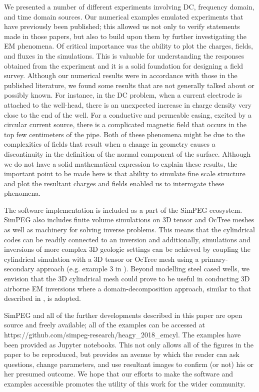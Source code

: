 We presented a number of different experiments involving DC, frequency domain, and time domain sources. Our numerical examples emulated experiments that have previously been published; this allowed us not only to verify statements made in those papers, but also to build upon them by further investigating the EM phenomena. Of critical importance was the ability to plot the charges, fields, and fluxes in the simulations. This is valuable for understanding the responses obtained from the experiment and it is a solid foundation for designing a field survey. Although our numerical results were in accordance with those in the published literature, we found some results that are not generally talked about or possibly known. For instance, in the DC problem, when a current electrode is attached to the well-head, there is an unexpected increase in charge density very close to the end of the well. For a conductive and permeable casing, excited by a circular current source, there is a complicated magnetic field that occurs in the top few centimeters of the pipe. Both of these phenomena might be due to the complexities of fields that result when a change in geometry causes a discontinuity in the definition of the normal component of the surface. Although we do not have a solid mathematical expression to explain these results, the important point to be made here is that ability to simulate fine scale structure and plot the resultant charges and fields enabled us to interrogate these phenomena.


The software implementation is included as a part of the SimPEG ecosystem. SimPEG also includes finite volume simulations on 3D tensor and OcTree meshes as well as machinery for solving inverse problems. This means that the cylindrical codes can be readily connected to an inversion and additionally, simulations and inversions of more complex 3D geologic settings can be achieved by coupling the cylindrical simulation with a 3D tensor or OcTree mesh using a primary-secondary approach (e.g. example 3 in \cite{Heagy2017}). Beyond modelling steel cased wells, we envision that the 3D cylindrical mesh could prove to be useful in conducting 3D airborne EM inversions where a domain-decomposition approach, similar to that described in \cite{Yang2014}, is adopted.

SimPEG and all of the further developments described in this paper are open source and freely available; all of the examples can be accessed at https://github.com/simpeg-research/heagy\_2018\_emcyl. The examples have been provided as Jupyter notebooks. This not only allows all of the figures in the paper to be reproduced, but provides an avenue by which the reader can ask questions, change parameters, and use resultant images to confirm (or not) his or her presumed outcome. We hope that our efforts to make the software and examples accessible promotes the utility of this work for the wider community.


